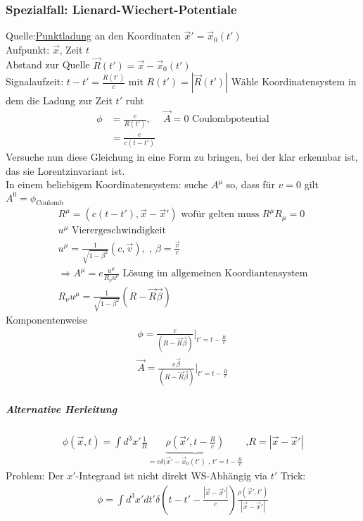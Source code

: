 \documentclass[a4paper]{article}
\begin{document}
\subsubsection{Spezialfall: Lienard-Wiechert-Potentiale}
Quelle:\underline{Punktladung} an den Koordinaten $\vec{x}'=\vec{x}_0(t')$ \\
Aufpunkt: $\vec{x}$, Zeit $t$\\
Abstand zur Quelle $\vec{R}(t')=\vec{x}-\vec{x}_0(t')$\\
Signalaufzeit: $t-t'=\frac{R(t')}{c}$ mit $R(t')=|\vec{R}(t')|$
Wähle Koordinatensystem in dem die Ladung zur Zeit $t'$ ruht
\begin{align}
\phi&=\frac{e}{R(t')}, & \vec{A}=0 \text{ Coulombpotential}\\
&=\frac{e}{c(t-t')}
\end{align}
Versuche nun diese Gleichung in eine Form zu bringen, bei der klar erkennbar
ist, das sie Lorentzinvariant ist.\\
In einem beliebigem Koordinatensystem: suche $A^\mu$ so, dass für $v=0$ gilt
$A^0=\phi_{\text{Coulomb}}$\\
\begin{align}
R^\mu=(c(t-t'),\vec{x}-\vec{x}') \text{ wofür gelten muss }R^\mu R_\mu=0\\
u^\mu \text{ Vierergeschwindigkeit}\\
u^\mu=\frac{1}{\sqrt{1-\beta^2}}(c,\vec{v}), \text{ , }
\beta=\frac{\vec{v}}{c}\\
\Rightarrow A^\mu=e\frac{u^\mu}{R_\nu u^\nu} \text{ Lösung im allgemeinen
Koordiantensystem}\\
R_\nu u^\mu=\frac{1}{\sqrt{1-\beta^2}}(R-\vec{R}\vec{\beta})
\end{align}
Komponentenweise
\begin{align}
\phi=\frac{e}{(R-\vec{R}\vec{\beta})}|_{t'=t-\frac{R}{c}}\\
\vec{A}=\frac{e\vec{\beta}}{(R-\vec{R}\vec{\beta})}|_{t'=t-\frac{R}{c}}
\end{align}
\subparagraph{Alternative Herleitung}
\begin{align}
\phi(\vec{x},t)=\int d^3x' \frac{1}{R}
\underbrace{\rho(\vec{x}',t-\frac{R}{c})}_{=e
\delta(\vec{x}'-\vec{x}_0(t')\text{ , }t'=t-\frac{R}{c}} \text{ ,
}R=|\vec{x}-\vec{x}'|
\end{align}
Problem: Der $x'$-Integrand ist nicht direkt WS-Abhängig via $t'$
Trick: 
\begin{align}
\phi=\int d^3x' dt' \delta\left(t-t'-\frac{|\vec{x}-\vec{x}'|}{c}\right)
\frac{\rho(\vec{x}',t')}{|\vec{x}-\vec{x}'|}\\
\end{align}
\end{document}
